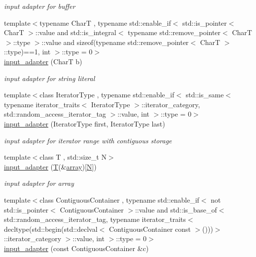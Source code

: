 \begin{DoxyCompactItemize}
\begin{DoxyCompactList}\small\item\em input adapter for buffer \end{DoxyCompactList}\item 
{\footnotesize template$<$typename CharT , typename std\+::enable\+\_\+if$<$ std\+::is\+\_\+pointer$<$ Char\+T $>$\+::value and std\+::is\+\_\+integral$<$ typename std\+::remove\+\_\+pointer$<$ Char\+T $>$\+::type $>$\+::value and sizeof(typename std\+::remove\+\_\+pointer$<$ Char\+T $>$\+::type)==1, int $>$\+::type  = 0$>$ }\\\mbox{\hyperlink{classnlohmann_1_1detail_1_1input__adapter_a86f035d9c4319360014b922b5e433ced}{input\+\_\+adapter}} (CharT b)
\begin{DoxyCompactList}\small\item\em input adapter for string literal \end{DoxyCompactList}\item 
{\footnotesize template$<$class Iterator\+Type , typename std\+::enable\+\_\+if$<$ std\+::is\+\_\+same$<$ typename iterator\+\_\+traits$<$ Iterator\+Type $>$\+::iterator\+\_\+category, std\+::random\+\_\+access\+\_\+iterator\+\_\+tag $>$\+::value, int $>$\+::type  = 0$>$ }\\\mbox{\hyperlink{classnlohmann_1_1detail_1_1input__adapter_ad6824b0f792691f75186c527fa31a6b4}{input\+\_\+adapter}} (Iterator\+Type first, Iterator\+Type last)
\begin{DoxyCompactList}\small\item\em input adapter for iterator range with contiguous storage \end{DoxyCompactList}\item 
{\footnotesize template$<$class T , std\+::size\+\_\+t N$>$ }\\\mbox{\hyperlink{classnlohmann_1_1detail_1_1input__adapter_aa2392138bf8307df1994dc7eb22d51ce}{input\+\_\+adapter}} (\mbox{\hyperlink{_keyboard_event_8h_adf1f3edb9115acb0a1e04209b7a9937b}{T}}(\&\mbox{\hyperlink{namespacenlohmann_1_1detail_a1ed8fc6239da25abcaf681d30ace4985af1f713c9e000f5d3f280adbd124df4f5}{array}})\mbox{[}\mbox{\hyperlink{_keyboard_event_8h_a8cc2e7240164328fdc3f0e5e21032c56}{N}}\mbox{]})
\begin{DoxyCompactList}\small\item\em input adapter for array \end{DoxyCompactList}\item 
{\footnotesize template$<$class Contiguous\+Container , typename std\+::enable\+\_\+if$<$ not std\+::is\+\_\+pointer$<$ Contiguous\+Container $>$\+::value and std\+::is\+\_\+base\+\_\+of$<$ std\+::random\+\_\+access\+\_\+iterator\+\_\+tag, typename iterator\+\_\+traits$<$ decltype(std\+::begin(std\+::declval$<$ Contiguous\+Container const $>$()))$>$\+::iterator\+\_\+category $>$\+::value, int $>$\+::type  = 0$>$ }\\\mbox{\hyperlink{classnlohmann_1_1detail_1_1input__adapter_a6f92fe82cb49a508dbfb297c5630cc7f}{input\+\_\+adapter}} (const Contiguous\+Container \&c)

\end{DoxyCompactItemize}
